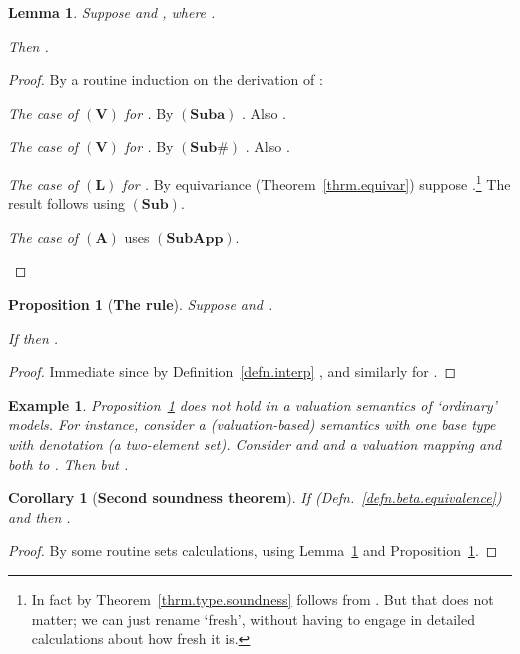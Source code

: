 \documentclass[submission,copyright]{eptcs}
\newtheorem{prop}[thrm]{Proposition}
\newtheorem{lemm}[thrm]{Lemma}
\newtheorem{corr}[thrm]{Corollary}
\newtheorem{xmpl}[thrm]{Example}
\newcommand{\rulefont}[1]{\ensuremath{(\mathbf{#1})}}
\begin{document}
\begin{lemm}
\label{lemm.st.beta.1}
Suppose  and , where .

Then .
\end{lemm}
\begin{proof}
By a routine induction on the derivation of :
\begin{itemize*}
\item \emph{The case of \rulefont{V} for .}\quad
By \rulefont{Suba} .
Also .
\item \emph{The case of \rulefont{V} for .}\quad
By \rulefont{Sub\#} .
Also .
\item \emph{The case of \rulefont{L} for .}\quad
By equivariance (Theorem~\ref{thrm.equivar}) suppose .\footnote{In fact by Theorem~\ref{thrm.type.soundness}  follows from .  But that does not matter; we can just rename  `fresh', without having to engage in detailed calculations about how fresh it is.}
The result follows using \rulefont{Sub\text{}}.
\item
\emph{The case of \rulefont{A}} uses \rulefont{SubApp}.
\qedhere\end{itemize*}
\end{proof}

\begin{prop}[\bf The  rule]
\label{prop.xi}
Suppose  and .

If  then .
\end{prop}
\begin{proof}
Immediate since by Definition~\ref{defn.interp} , and similarly for .
\end{proof}

\begin{xmpl}
\label{xmpl.two.point}
Proposition~\ref{prop.xi} does not hold in a valuation semantics of `ordinary' models.
For instance, consider a (valuation-based) semantics with one base type  with denotation  (a two-element set).
Consider  and  and a valuation  mapping  and  both to .
Then  but .
\end{xmpl}





\begin{corr}[\bf Second soundness theorem]
If  (Defn.~\ref{defn.beta.equivalence}) and  then .
\end{corr}
\begin{proof}
By some routine sets calculations, using Lemma~\ref{lemm.st.beta.1} and Proposition~\ref{prop.xi}.
\end{proof}
 
\end{document}
